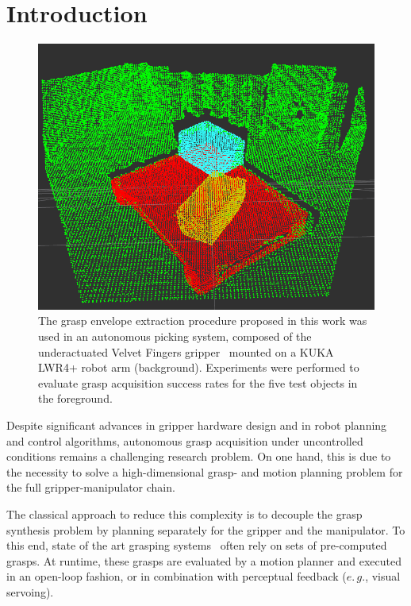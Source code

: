\section{Introduction}
\label{sec:intro}
%
\begin{figure}[t!]
\centering
\includegraphics[width = \linewidth]{figs/setup}
\caption{The grasp envelope extraction procedure proposed in this work was used in an autonomous picking system, composed of the underactuated Velvet Fingers gripper~\cite{Tinc12} mounted on a KUKA LWR4+ robot arm (background). Experiments were performed to evaluate grasp acquisition success rates for the five test objects in the foreground. }
\label{fig:setup}
\end{figure}

Despite significant advances in gripper hardware design and in robot planning and control algorithms, autonomous grasp acquisition under uncontrolled conditions remains a challenging research problem.
On one hand, this is due to the necessity to solve a high-dimensional grasp- and motion planning problem for the full gripper-manipulator chain.
%
\par
%
The classical approach to reduce this complexity is to decouple the grasp synthesis problem by planning separately for the gripper and the manipulator.
To this end, state of the art grasping systems~\cite{Bere07,Srin10, Krug14a, Stoy15} often rely on sets of pre-computed grasps. 
At runtime, these grasps are evaluated by a motion planner and executed in an open-loop fashion, or in combination with perceptual feedback ($e.\,g.$, visual servoing).
